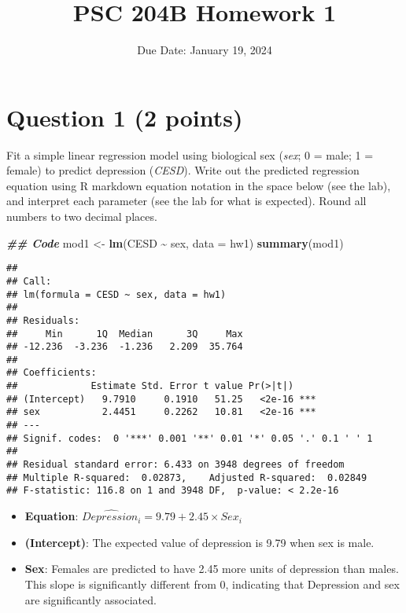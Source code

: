 \documentclass[
]{article}
\title{PSC 204B Homework 1}
\author{}
\date{\vspace{-2.5em}Due Date: January 19, 2024}
\newenvironment{Shaded}{\begin{snugshade}}{\end{snugshade}}
\newcommand{\AttributeTok}[1]{\textcolor[rgb]{0.13,0.29,0.53}{#1}}
\newcommand{\DocumentationTok}[1]{\textcolor[rgb]{0.56,0.35,0.01}{\textbf{\textit{#1}}}}
\newcommand{\FunctionTok}[1]{\textcolor[rgb]{0.13,0.29,0.53}{\textbf{#1}}}
\newcommand{\NormalTok}[1]{#1}
\newcommand{\OtherTok}[1]{\textcolor[rgb]{0.56,0.35,0.01}{#1}}
\newcommand{\SpecialCharTok}[1]{\textcolor[rgb]{0.81,0.36,0.00}{\textbf{#1}}}
\providecommand{\tightlist}{%
  \setlength{\itemsep}{0pt}\setlength{\parskip}{0pt}}
\begin{document}
\maketitle

\hypertarget{question-1-2-points}{%
\section{\texorpdfstring{Question 1 \textbf{(2
points)}}{Question 1 (2 points)}}\label{question-1-2-points}}

Fit a simple linear regression model using biological sex (\emph{sex}; 0
= male; 1 = female) to predict depression (\emph{CESD}). Write out the
predicted regression equation using R markdown equation notation in the
space below (see the lab), and interpret each parameter (see the lab for
what is expected). Round all numbers to two decimal places.

\begin{Shaded}
\begin{Highlighting}[]
\DocumentationTok{\#\# Code}
\NormalTok{mod1 }\OtherTok{\textless{}{-}} \FunctionTok{lm}\NormalTok{(CESD }\SpecialCharTok{\textasciitilde{}}\NormalTok{ sex, }\AttributeTok{data =}\NormalTok{ hw1)}
\FunctionTok{summary}\NormalTok{(mod1)}
\end{Highlighting}
\end{Shaded}

\begin{verbatim}
## 
## Call:
## lm(formula = CESD ~ sex, data = hw1)
## 
## Residuals:
##     Min      1Q  Median      3Q     Max 
## -12.236  -3.236  -1.236   2.209  35.764 
## 
## Coefficients:
##             Estimate Std. Error t value Pr(>|t|)    
## (Intercept)   9.7910     0.1910   51.25   <2e-16 ***
## sex           2.4451     0.2262   10.81   <2e-16 ***
## ---
## Signif. codes:  0 '***' 0.001 '**' 0.01 '*' 0.05 '.' 0.1 ' ' 1
## 
## Residual standard error: 6.433 on 3948 degrees of freedom
## Multiple R-squared:  0.02873,    Adjusted R-squared:  0.02849 
## F-statistic: 116.8 on 1 and 3948 DF,  p-value: < 2.2e-16
\end{verbatim}

\begin{itemize}
\tightlist
\item
  \textbf{Equation}:
  \(\widehat{Depression_i} = 9.79 + 2.45 \times Sex_i\)
\item
  \textbf{(Intercept)}: The expected value of depression is 9.79 when
  sex is male.
\item
  \textbf{Sex}: Females are predicted to have 2.45 more units of
  depression than males. This slope is significantly different from 0,
  indicating that Depression and sex are significantly associated.
\end{itemize}
\end{document}
